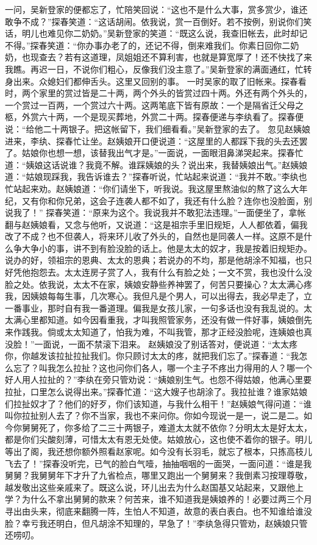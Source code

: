 \documentclass[12pt,oneside]{book}
\begin{document}
一问，吴新登家的便都忘了，忙陪笑回说：“这也不是什么大事，赏多赏少，谁还敢争不成？”探春笑道：“这话胡闹。依我说，赏一百倒好。若不按例，别说你们笑话，明儿也难见你二奶奶。”吴新登家的笑道：“既这么说，我查旧帐去，此时却记不得。”探春笑道：“你办事办老了的，还记不得，倒来难我们。你素日回你二奶奶，也现查去？若有这道理，凤姐姐还不算利害，也就是算宽厚了！还不快找了来我瞧。再迟一日，不说你们粗心，反像我们没主意了。”吴新登家的满面通红，忙转身出来。众媳妇们都伸舌头。这里又回别的事。
一时吴家的取了旧帐来。探春看时，两个家里的赏过皆是二十两，两个外头的皆赏过四十两。外还有两个外头的，一个赏过一百两，一个赏过六十两。这两笔底下皆有原故：一个是隔省迁父母之柩，外赏六十两，一个是现买葬地，外赏二十两。探春便递与李纨看了。探春便说：“给他二十两银子。把这帐留下，我们细看看。”吴新登家的去了。
忽见赵姨娘进来，李纨、探春忙让坐。赵姨娘开口便说道：“这屋里的人都踩下我的头去还罢了。姑娘你也想一想，该替我出气才是。”一面说，一面眼泪鼻涕哭起来。探春忙道：“姨娘这话说谁？我竟不解。谁踩姨娘的头？说出来，我替姨娘出气。”赵姨娘道：“姑娘现踩我，我告诉谁去？”探春听说，忙站起来说道：“我并不敢。”李纨也忙站起来劝。赵姨娘道：“你们请坐下，听我说。我这屋里熬油似的熬了这么大年纪，又有你和你兄弟，这会子连袭人都不如了，我还有什么脸？连你也没脸面，别说我了！”
探春笑道：“原来为这个。我说我并不敢犯法违理。”一面便坐了，拿帐翻与赵姨娘看，又念与他听，又说道：“这是祖宗手里旧规矩，人人都依着，偏我改了不成？也不但袭人，将来环儿收了外头的，自然也是同袭人一样。这原不是什么争大争小的事，讲不到有脸没脸的话上。他是太太的奴才，我是按着旧规矩办。说办的好，领祖宗的恩典、太太的恩典；若说办的不均，那是他胡涂不知福，也只好凭他抱怨去。太太连房子赏了人，我有什么有脸之处；一文不赏，我也没什么没脸之处。依我说，太太不在家，姨娘安静些养神罢了，何苦只要操心？太太满心疼我，因姨娘每每生事，几次寒心。我但凡是个男人，可以出得去，我必早走了，立一番事业，那时自有我一番道理。偏我是女孩儿家，一句多话也没有我乱说的。太太满心里都知道。如今因看重我，才叫我照管家务，还没有做一件好事，姨娘倒先来作践我。倘或太太知道了，怕我为难，不叫我管，那才正经没脸呢，连姨娘也真没脸！”一面说，一面不禁滚下泪来。
赵姨娘没了别话答对，便说道：“太太疼你，你越发该拉扯拉扯我们。你只顾讨太太的疼，就把我们忘了。”探春道：“我怎么忘了？叫我怎么拉扯？这也问你们各人，哪一个主子不疼出力得用的人？哪一个好人用人拉扯的？”李纨在旁只管劝说：“姨娘别生气。也怨不得姑娘，他满心里要拉扯，口里怎么说得出来。”探春忙道：“这大嫂子也胡涂了。我拉扯谁？谁家姑娘们拉扯奴才了？他们的好歹，你们该知道，与我什么相干！”赵姨娘气得问道：“谁叫你拉扯别人去了？你不当家，我也不来问你。你如今现说一是一，说二是二。如今你舅舅死了，你多给了二三十两银子，难道太太就不依你？分明太太是好太太，都是你们尖酸刻薄，可惜太太有恩无处使。姑娘放心，这也使不着你的银子。明儿等出了阁，我还想你额外照看赵家呢。如今没有长羽毛，就忘了根本，只拣高枝儿飞去了！”探春没听完，已气的脸白气噎，抽抽咽咽的一面哭，一面问道：“谁是我舅舅？我舅舅年下才升了九省检点，哪里又跑出一个舅舅来？我倒素习按理尊敬，越发敬出这些亲戚来了。既这么说，环儿出去为什么赵国基又站起来，又跟他上学？为什么不拿出舅舅的款来？何苦来，谁不知道我是姨娘养的！必要过两三个月寻出由头来，彻底来翻腾一阵，生怕人不知道，故意的表白表白。也不知谁给谁没脸？幸亏我还明白，但凡胡涂不知理的，早急了！”李纨急得只管劝，赵姨娘只管还唠叨。
\end{document}
